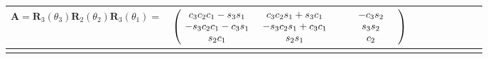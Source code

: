 \begin{table}[h]
\begin{tabular}{clccccccc}
    \footnotesize
        $\mathbf{A} = \mathbf{R}_3(\theta_3)\mathbf{R}_2(\theta_2)\mathbf{R}_3(\theta_1) = $
        &
        \footnotesize
        $\begin{pmatrix}
            \hspace{0.05 in}  c_3 c_2 c_1  -s_3 s_1  &  \hspace{0.05 in}   c_3 c_2 s_1 + s_3 c_1  &  \hspace{0.3 in}  -c_3 s_2  \hspace{0.2 in} \\
            \hspace{0.05 in} -s_3 c_2 c_1 - c_3 s_1  &  \hspace{0.05 in}  -s_3 c_2 s_1 + c_3 c_1  &  \hspace{0.3 in}   s_3 s_2  \hspace{0.2 in} \\
            \hspace{0.05 in}           s_2 c_1       &  \hspace{0.05 in}            s_2 s_1       &  \hspace{0.3 in}     c_2    \hspace{0.2 in} \\
        \end{pmatrix}  \vspace{.1 in}$\\

        \hline \hline
        \normalsize
        \end{tabular}
        \label{table:EulerAnglestoDCM}
\end{table}


